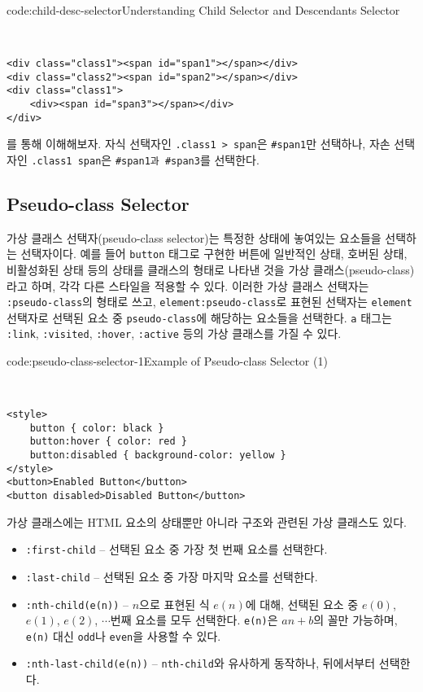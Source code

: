 \begin{codeenv}{code:child-desc-selector}{Understanding Child Selector and Descendants Selector}\begin{verbatim}


<div class="class1"><span id="span1"></span></div>
<div class="class2"><span id="span2"></span></div>
<div class="class1">
    <div><span id="span3"></span></div>
</div>
\end{verbatim}
\end{codeenv}

를 통해 이해해보자. 자식 선택자인 \verb|.class1 > span|은 \verb|#span1|만 선택하나, 자손 선택자인 \texttt{.class1 span}은 \verb|#span1과 #span3|를 선택한다.

\subsection*{Pseudo-class Selector}
가상 클래스 선택자(pseudo-class selector)는 특정한 상태에 놓여있는 요소들을 선택하는 선택자이다. 예를 들어 \verb|button| 태그로 구현한 버튼에 일반적인 상태, 호버된 상태, 비활성화된 상태 등의 상태를 클래스의 형태로 나타낸 것을 가상 클래스(pseudo-class)라고 하며, 각각 다른 스타일을 적용할 수 있다. 이러한 가상 클래스 선택자는 \verb|:pseudo-class|의 형태로 쓰고, \verb|element:pseudo-class|로 표현된 선택자는 \verb|element| 선택자로 선택된 요소 중 \verb|pseudo-class|에 해당하는 요소들을 선택한다. \verb|a| 태그는 \verb|:link|, \verb|:visited|, \verb|:hover|, \verb|:active| 등의 가상 클래스를 가질 수 있다.

\begin{codeenv}{code:pseudo-class-selector-1}{Example of Pseudo-class Selector (1)}\begin{verbatim}


<style>
    button { color: black }
    button:hover { color: red }
    button:disabled { background-color: yellow }
</style>
<button>Enabled Button</button>
<button disabled>Disabled Button</button>
\end{verbatim}
\end{codeenv}

가상 클래스에는 HTML 요소의 상태뿐만 아니라 구조와 관련된 가상 클래스도 있다.

\begin{itemize}
    \item \verb|:first-child| – 선택된 요소 중 가장 첫 번째 요소를 선택한다.
    \item \verb|:last-child| – 선택된 요소 중 가장 마지막 요소를 선택한다.
    \item \verb|:nth-child(e(n))| – $n$으로 표현된 식 $e(n)$에 대해, 선택된 요소 중 $e(0)$, $e(1)$, $e(2)$, $\cdots$번째 요소를 모두 선택한다. \verb|e(n)|은 $an+b$의 꼴만 가능하며, \verb|e(n)| 대신 \verb|odd|나 \verb|even|을 사용할 수 있다.
    \item \verb|:nth-last-child(e(n))| – \verb|nth-child|와 유사하게 동작하나, 뒤에서부터 선택한다.
\end{itemize}

